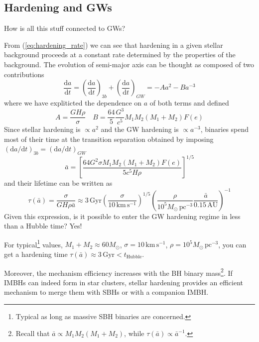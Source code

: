 \subsection{Hardening and GWs}
How is all this stuff connected to GWs?
\par From (\ref{eq:hardening_rate}) we can see that hardening in a given stellar background proceeds at a constant rate determined by the properties of the background. The evolution of semi-major axis can be thought as composed of two contributions
\begin{equation*}
    \frac{\text{d}a}{\text{d}t} = \left(\frac{\text{d}a}{\text{d}t}\right)_{3b}+ \left(\frac{\text{d}a}{\text{d}t}\right)_{GW} = -Aa^{2}-Ba^{-3}
\end{equation*}
where we have expliticted the dependence on $a$ of both terms and defined
\begin{equation*}
    A = \frac{GH\rho}{\sigma} \quad B = \frac{64}{5}\frac{G^{3}}{c^{5}}M_{1}M_{2}(M_{1}+M_{2})F(e)
\end{equation*}
Since stellar hardening is $\propto a^{2}$ and the GW hardening is $\propto a^{-3}$, binaries spend most of their time at the transition separation obtained by imposing $(\text{d}a/\text{d}t)_{3b} = (\text{d}a/\text{d}t)_{GW}$
\begin{equation*}
    \bar{a} = \left[\frac{64G^{2}\sigma M_{1}M_{2}(M_{1}+M_{2})F(e)}{5c^{5}H\rho}\right]^{1/5}
\end{equation*} 
and their lifetime can be written as 
\begin{equation*}
    \tau(\bar{a}) =\frac{\sigma}{GH\rho\bar{a}} \approx 3\,\text{Gyr}\left(\frac{\sigma}{10\,\text{km}\,\text{s}^{-1}}\right)^{1/5}\left(\frac{\rho}{10^{5}M_{\odot}\,\text{pc}^{-3}}\frac{\bar{a}}{0.15\,\text{AU}}\right)^{-1}
\end{equation*}
Given this expression, is it possible to enter the GW hardening regime in less than a Hubble time? Yes!
\par For typical\footnote{Typical as long as massive SBH binaries are concerned.} values, $M_{1}+M_{2}\approx 60M_{\odot}$, $\sigma = 10\,\text{km}\,\text{s}^{-1}$, $\rho = 10^{5}M_{\odot}\,\text{pc}^{-3}$, you can get a hardening time $\tau(\bar{a})\approx 3\,\text{Gyr}<t_{\text{Hubble}}$.
\par Moreover, the mechanism eﬃciency increases with the BH binary mass\footnote{Recall that $\bar{a} \propto M_{1}M_{2}(M_{1}+M_{2})$, while $\tau(\bar{a})\propto \bar{a}^{-1}$.}. If IMBHs can indeed form in star clusters, stellar hardening provides an eﬃcient mechanism to merge them with SBHs or with a companion IMBH. 
